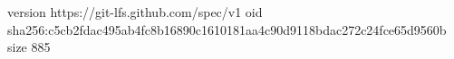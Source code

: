 version https://git-lfs.github.com/spec/v1
oid sha256:c5cb2fdac495ab4fc8b16890c1610181aa4c90d9118bdac272c24fce65d9560b
size 885
